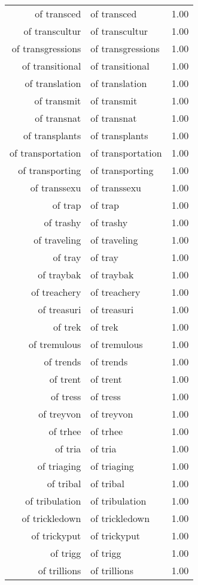\begin{table}[ht]
\begin{tabular}{rlr}
  of transced & of transced & 1.00 \\ 
  of transcultur & of transcultur & 1.00 \\ 
  of transgressions & of transgressions & 1.00 \\ 
  of transitional & of transitional & 1.00 \\ 
  of translation & of translation & 1.00 \\ 
  of transmit & of transmit & 1.00 \\ 
  of transnat & of transnat & 1.00 \\ 
  of transplants & of transplants & 1.00 \\ 
  of transportation & of transportation & 1.00 \\ 
  of transporting & of transporting & 1.00 \\ 
  of transsexu & of transsexu & 1.00 \\ 
  of trap & of trap & 1.00 \\ 
  of trashy & of trashy & 1.00 \\ 
  of traveling & of traveling & 1.00 \\ 
  of tray & of tray & 1.00 \\ 
  of traybak & of traybak & 1.00 \\ 
  of treachery & of treachery & 1.00 \\ 
  of treasuri & of treasuri & 1.00 \\ 
  of trek & of trek & 1.00 \\ 
  of tremulous & of tremulous & 1.00 \\ 
  of trends & of trends & 1.00 \\ 
  of trent & of trent & 1.00 \\ 
  of tress & of tress & 1.00 \\ 
  of treyvon & of treyvon & 1.00 \\ 
  of trhee & of trhee & 1.00 \\ 
  of tria & of tria & 1.00 \\ 
  of triaging & of triaging & 1.00 \\ 
  of tribal & of tribal & 1.00 \\ 
  of tribulation & of tribulation & 1.00 \\ 
  of trickledown & of trickledown & 1.00 \\ 
  of trickyput & of trickyput & 1.00 \\ 
  of trigg & of trigg & 1.00 \\ 
  of trillions & of trillions & 1.00 \\ 

\end{tabular}
\end{table}
